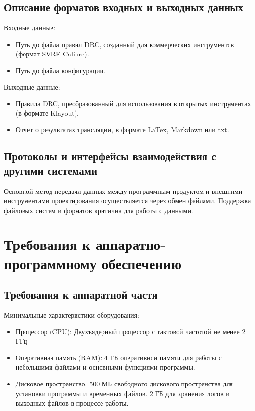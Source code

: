 \subsection{Описание форматов входных и выходных данных}

Входные данные:

\begin{itemize}
	\item Путь до файла правил DRC,
		созданный для коммерческих инструментов (формат SVRF Calibre).
	\item Путь до файла конфигурации.
\end{itemize}

Выходные данные:

\begin{itemize}
	\item Правила DRC, преобразованный для использования
		в открытых инструментах (в формате Klayout).
	\item Отчет о результатах трансляции, в формате LaTex, Markdown или txt.
\end{itemize}


\subsection{Протоколы и интерфейсы взаимодействия с другими системами}

Основной метод передачи данных между программным продуктом
и внешними инструментами проектирования осуществляется через обмен файлами.
Поддержка файловых систем и форматов критична для работы с данными.

\section{Требования к аппаратно-программному обеспечению}

\subsection{Требования к аппаратной части}

Минимальные характеристики оборудования:

\begin{itemize}
	\item Процессор (CPU):
		Двухъядерный процессор с тактовой частотой не менее 2 ГГц
	\item Оперативная память (RAM):
		4 ГБ оперативной памяти для работы с небольшими файлами
		и основными функциями программы.
	\item Дисковое пространство:
		500 МБ свободного дискового пространства для установки программы
		и временных файлов.
		2 ГБ для хранения логов и выходных файлов в процессе работы.
\end{itemize}

